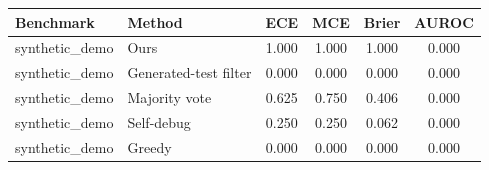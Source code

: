 \begin{tabular}{llcccc}
\toprule
Benchmark & Method & ECE & MCE & Brier & AUROC \\
\midrule
synthetic_demo & Ours & 1.000 & 1.000 & 1.000 & 0.000 \\
synthetic_demo & Generated-test filter & 0.000 & 0.000 & 0.000 & 0.000 \\
synthetic_demo & Majority vote & 0.625 & 0.750 & 0.406 & 0.000 \\
synthetic_demo & Self-debug & 0.250 & 0.250 & 0.062 & 0.000 \\
synthetic_demo & Greedy & 0.000 & 0.000 & 0.000 & 0.000 \\
\bottomrule
\end{tabular}
